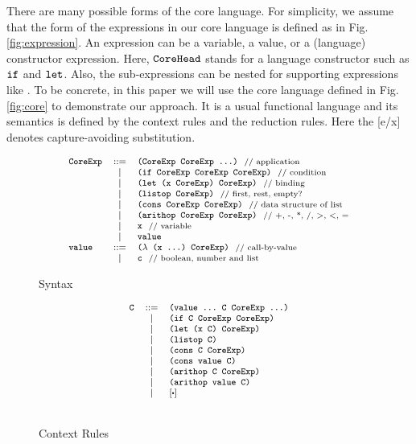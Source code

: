 There are many possible forms of the core language. For simplicity, we assume that the form of the expressions in our core language is defined as in Fig. \ref{fig:expression}. An expression can be a variable, a value, or a (language) constructor expression. Here, $\mbox{\tt CoreHead}$ stands for a language constructor such as $\mbox{\tt if}$ and $\mbox{\tt let}$. Also, the sub-expressions can be nested for supporting expressions like . To be concrete, in this paper we will use the core language defined in Fig.  \ref{fig:core} to demonstrate our approach. It is a usual functional language and its semantics is defined by the context rules and the reduction rules. Here the [e/x] denotes capture-avoiding substitution.

\begin{figure*}[t]
\begin{subfigure}{0.55\linewidth}
\[
{\footnotesize
		\begin{array}{lcl}
		\mbox{\tt CoreExp} &::=& \texttt{(CoreExp~CoreExp~...)} ~~\mbox{{\scriptsize // application}}\\
		&|& \mbox{\tt (if~CoreExp~CoreExp~CoreExp)} ~~\mbox{{\scriptsize // condition}}\\
		&|& \mbox{\tt (let~(x~CoreExp)~CoreExp)} ~~\mbox{{\scriptsize // binding}}\\
		&|& \mbox{\tt (listop~CoreExp)} ~~\mbox{{\scriptsize // first, rest, empty?}}\\
		&|& \mbox{\tt (cons~CoreExp~CoreExp)} ~~\mbox{{\scriptsize // data structure of list}}\\
		&|& \mbox{\tt (arithop~CoreExp~CoreExp)} ~~\mbox{{\scriptsize // +, -, *, /, >, <, =}}\\
		&|& \mbox{\tt x} ~~\mbox{{\scriptsize // variable}}\\
		&|& \mbox{\tt value}\\
		\mbox{\tt value} &::=& \mbox{\tt ($\lambda$~(x~...)~CoreExp)} ~~\mbox{{\scriptsize // call-by-value}}\\
		&|& \mbox{\tt c} ~~\mbox{{\scriptsize // boolean, number and list}}
		\end{array}
}
\]
\caption{Syntax}
\end{subfigure}
\begin{subfigure}{0.4\linewidth}
\[
{\footnotesize
		\begin{array}{lcl}
		\Code{C} &::=& \Code{(value~...~C~CoreExp~...)}\\
		&|& \Code{(if~C~CoreExp~CoreExp)}\\
		&|& \Code{(let~(x~C)~CoreExp)}\\
		&|& \Code{(listop~C)}\\
		&|& \Code{(cons~C~CoreExp)}\\
		&|& \Code{(cons~value~C)}\\
		&|& \Code{(arithop~C~CoreExp)}\\
		&|& \Code{(arithop~value~C)}\\
		&|& [\bigcdot]\\[1.5em]
		\end{array}
}
\]
\caption{Context Rules}
\end{subfigure}


\end{figure*}
